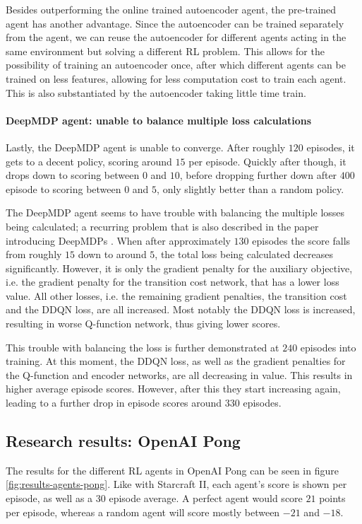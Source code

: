 Besides outperforming the online trained autoencoder agent, the pre-trained agent has another advantage. Since the autoencoder can be trained separately from the agent, we can reuse the autoencoder for different agents acting in the same environment but solving a different RL problem. This allows for the possibility of training an autoencoder once, after which different agents can be trained on less features, allowing for less computation cost to train each agent. This is also substantiated by the autoencoder taking little time train.

\paragraph{DeepMDP agent: unable to balance multiple loss calculations}

Lastly, the DeepMDP agent is unable to converge. After roughly $120$ episodes, it gets to a decent policy, scoring around $15$ per episode. Quickly after though, it drops down to scoring between $0$ and $10$, before dropping further down after $400$ episode to scoring between $0$ and $5$, only slightly better than a random policy.

The DeepMDP agent seems to have trouble with balancing the multiple losses being calculated; a recurring problem that is also described in the paper introducing DeepMDPs \cite{deepmdp}. When after approximately $130$ episodes the score falls from roughly $15$ down to around $5$, the total loss being calculated decreases significantly. However, it is only the gradient penalty for the auxiliary objective, i.e. the gradient penalty for the transition cost network, that has a lower loss value.  All other losses, i.e. the remaining gradient penalties, the transition cost and the DDQN loss, are all increased. Most notably the DDQN loss is increased, resulting in worse Q-function network, thus giving lower scores.

This trouble with balancing the loss is further demonstrated at $240$ episodes into training. At this moment, the DDQN loss, as well as the gradient penalties for the Q-function and encoder networks, are all decreasing in value. This results in higher average episode scores. However, after this they start increasing again, leading to a further drop in episode scores around $330$ episodes.

\subsection{Research results: OpenAI Pong}\label{research-results-pong}
The results for the different RL agents in OpenAI Pong can be seen in figure \ref{fig:results-agents-pong}. Like with Starcraft II, each agent's score is shown per episode, as well as a $30$ episode average. A perfect agent would score $21$ points per episode, whereas a random agent will score mostly between $-21$ and $-18$.

